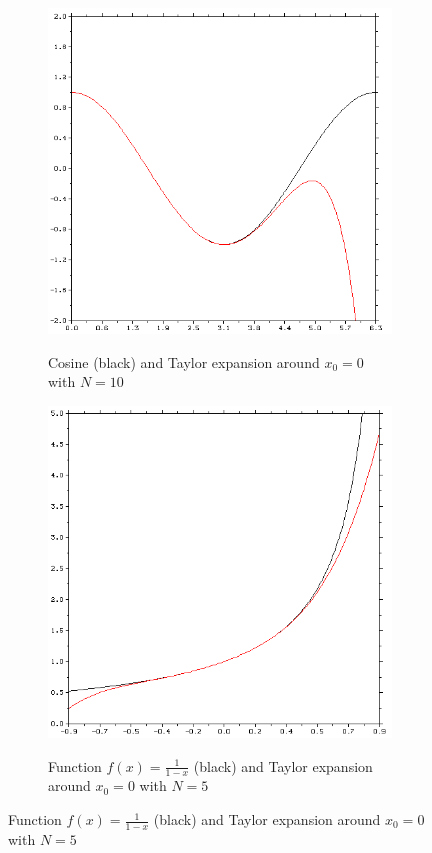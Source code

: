 \begin{figure}
    \begin{subfigure}[h]{0.5\textwidth}
        \centering
        \includegraphics[width = \textwidth]{./doc/Figures/Taylor1.png}  \\
        \caption{Cosine (black) and Taylor expansion around $x_0 = 0$ with $N = 10$}
        \label{fig:Taylor1}
    \end{subfigure}
    \hspace{\fill}
    \begin{subfigure}[h]{0.5\textwidth}
        \centering
        \includegraphics[width = \textwidth]{./doc/Figures/Taylor2.png}  \\
        \caption{Function $f(x) = \frac{1}{1-x}$ (black) and Taylor expansion around $x_0 = 0$ with $N = 5$}
        \label{fig:Taylor2}
    \end{subfigure}    


\end{figure}
